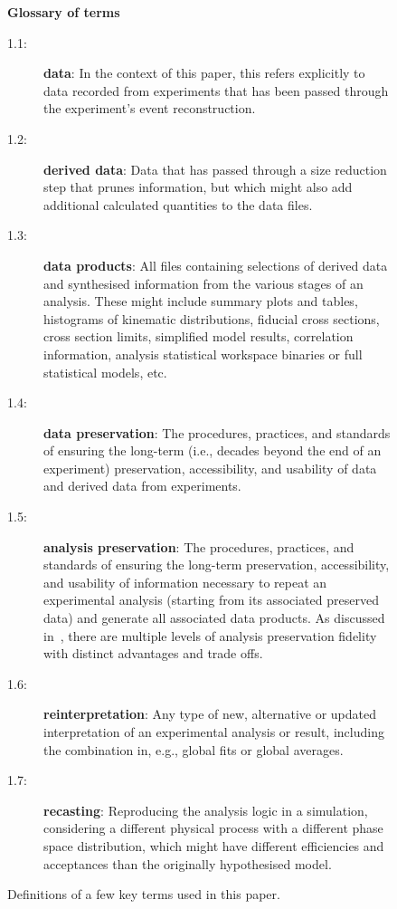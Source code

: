 \documentclass[11pt]{article}
\begin{document}
\begin{figure}[!ht]
\begin{tcolorbox}
\begin{center}
{\large \textbf{Glossary of terms}}
\end{center}
%
\begin{description}
    \item[1.1:] \textbf{\Gls{data}}: In the context of this paper, this refers explicitly to data recorded from experiments that has been passed through the experiment's event reconstruction.
    \item[1.2:] \textbf{\Gls{derived data}}: Data that has passed through a size reduction step that prunes information, but which might also add additional calculated quantities to the data files.
    \item[1.3:] \textbf{\Glspl{data product}}: All files containing selections of derived data and synthesised information from the various stages of an analysis.
These might include summary plots and tables, histograms of kinematic distributions, fiducial cross sections, cross section limits, simplified model results, correlation information, analysis statistical workspace binaries or full statistical models, etc.
    \item[1.4:] \textbf{\Gls{data preservation}}: The procedures, practices, and standards of ensuring the long-term (i.e., decades beyond the end of an experiment) preservation, accessibility, and usability of data and derived data from experiments.
    \item[1.5:] \textbf{\Gls{analysis preservation}}: The procedures, practices, and standards of ensuring the long-term preservation, accessibility, and usability of information necessary to repeat an experimental analysis (starting from its associated preserved data) and generate all associated \glspl{data product}.
    As discussed in~, there are multiple levels of analysis preservation fidelity with distinct advantages and trade offs.
    \item[1.6:] \textbf{\Gls{reinterpretation}}: Any type of new, alternative or updated interpretation of an experimental analysis or result, including the combination in, e.g., global fits or global averages. 
    \item[1.7:] \textbf{\Gls{recasting}}: Reproducing the analysis logic in a simulation, considering a different physical process with a different phase space distribution, which might have different efficiencies and acceptances than the originally hypothesised model.
\end{description}
\end{tcolorbox}
\caption{Definitions of a few key terms used in this paper.}
\label{fig:glossary}
\end{figure}
\end{document}
